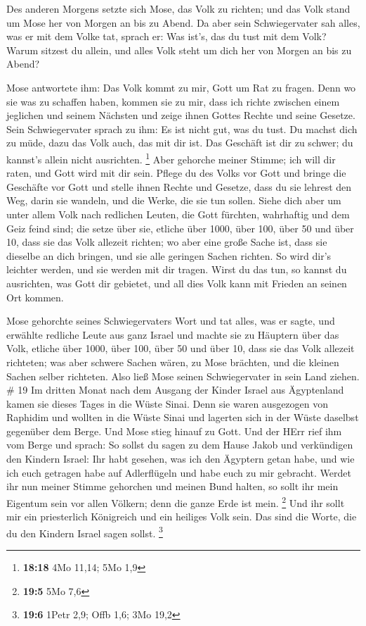  Des anderen Morgens setzte sich Mose, das Volk zu richten;
und das Volk stand um Mose her von Morgen an bis zu Abend. 
Da aber sein Schwiegervater sah alles, was er mit dem Volke tat, sprach
er: Was ist's, das du tust mit dem Volk? Warum sitzest du allein, und
alles Volk steht um dich her von Morgen an bis zu Abend?

 Mose antwortete ihm: Das Volk kommt zu mir, Gott um Rat zu
fragen.  Denn wo sie was zu schaffen haben, kommen sie zu
mir, dass ich richte zwischen einem jeglichen und seinem Nächsten und
zeige ihnen Gottes Rechte und seine Gesetze.  Sein
Schwiegervater sprach zu ihm: Es ist nicht gut, was du tust.
 Du machst dich zu müde, dazu das Volk auch, das mit dir
ist. Das Geschäft ist dir zu schwer; du kannst's allein nicht
ausrichten. \footnote{\textbf{18:18} 4Mo 11,14; 5Mo 1,9} 
Aber gehorche meiner Stimme; ich will dir raten, und Gott wird mit dir
sein. Pflege du des Volks vor Gott und bringe die Geschäfte vor Gott
 und stelle ihnen Rechte und Gesetze, dass du sie lehrest
den Weg, darin sie wandeln, und die Werke, die sie tun sollen.
 Siehe dich aber um unter allem Volk nach redlichen Leuten,
die Gott fürchten, wahrhaftig und dem Geiz feind sind; die setze über
sie, etliche über 1000, über 100, über 50 und über 10, 
dass sie das Volk allezeit richten; wo aber eine große Sache ist, dass
sie dieselbe an dich bringen, und sie alle geringen Sachen richten. So
wird dir's leichter werden, und sie werden mit dir tragen. 
Wirst du das tun, so kannst du ausrichten, was Gott dir gebietet, und
all dies Volk kann mit Frieden an seinen Ort kommen.

 Mose gehorchte seines Schwiegervaters Wort und tat alles,
was er sagte,  und erwählte redliche Leute aus ganz Israel
und machte sie zu Häuptern über das Volk, etliche über 1000, über 100,
über 50 und über 10,  dass sie das Volk allezeit richteten;
was aber schwere Sachen wären, zu Mose brächten, und die kleinen Sachen
selber richteten.  Also ließ Mose seinen Schwiegervater in
sein Land ziehen. \# 19  Im dritten Monat nach dem Ausgang
der Kinder Israel aus Ägyptenland kamen sie dieses Tages in die Wüste
Sinai.  Denn sie waren ausgezogen von Raphidim und wollten
in die Wüste Sinai und lagerten sich in der Wüste daselbst gegenüber dem
Berge.  Und Mose stieg hinauf zu Gott. Und der HErr rief ihm
vom Berge und sprach: So sollst du sagen zu dem Hause Jakob und
verkündigen den Kindern Israel:  Ihr habt gesehen, was ich
den Ägyptern getan habe, und wie ich euch getragen habe auf Adlerflügeln
und habe euch zu mir gebracht.  Werdet ihr nun meiner Stimme
gehorchen und meinen Bund halten, so sollt ihr mein Eigentum sein vor
allen Völkern; denn die ganze Erde ist mein. \footnote{\textbf{19:5} 5Mo
  7,6}  Und ihr sollt mir ein priesterlich Königreich und
ein heiliges Volk sein. Das sind die Worte, die du den Kindern Israel
sagen sollst. \footnote{\textbf{19:6} 1Petr 2,9; Offb 1,6; 3Mo 19,2}

